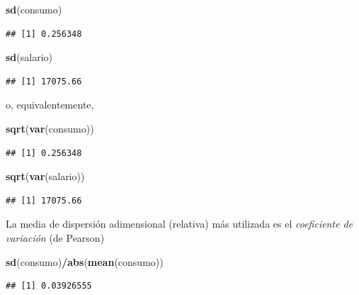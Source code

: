 \documentclass[]{book}
\newenvironment{Shaded}{\begin{snugshade}}{\end{snugshade}}
\newcommand{\KeywordTok}[1]{\textcolor[rgb]{0.13,0.29,0.53}{\textbf{#1}}}
\newcommand{\NormalTok}[1]{#1}
\newcommand{\OperatorTok}[1]{\textcolor[rgb]{0.81,0.36,0.00}{\textbf{#1}}}
\begin{document}
\begin{Shaded}
\begin{Highlighting}[]
\KeywordTok{sd}\NormalTok{(consumo)}
\end{Highlighting}
\end{Shaded}

\begin{verbatim}
## [1] 0.256348
\end{verbatim}

\begin{Shaded}
\begin{Highlighting}[]
\KeywordTok{sd}\NormalTok{(salario)}
\end{Highlighting}
\end{Shaded}

\begin{verbatim}
## [1] 17075.66
\end{verbatim}

o, equivalentemente,

\begin{Shaded}
\begin{Highlighting}[]
\KeywordTok{sqrt}\NormalTok{(}\KeywordTok{var}\NormalTok{(consumo))}
\end{Highlighting}
\end{Shaded}

\begin{verbatim}
## [1] 0.256348
\end{verbatim}

\begin{Shaded}
\begin{Highlighting}[]
\KeywordTok{sqrt}\NormalTok{(}\KeywordTok{var}\NormalTok{(salario))}
\end{Highlighting}
\end{Shaded}

\begin{verbatim}
## [1] 17075.66
\end{verbatim}

La media de dispersión adimensional (relativa) más utilizada
es el \emph{coeficiente de variación} (de Pearson)

\begin{Shaded}
\begin{Highlighting}[]
\KeywordTok{sd}\NormalTok{(consumo)}\OperatorTok{/}\KeywordTok{abs}\NormalTok{(}\KeywordTok{mean}\NormalTok{(consumo))}
\end{Highlighting}
\end{Shaded}

\begin{verbatim}
## [1] 0.03926555
\end{verbatim}
\end{document}
